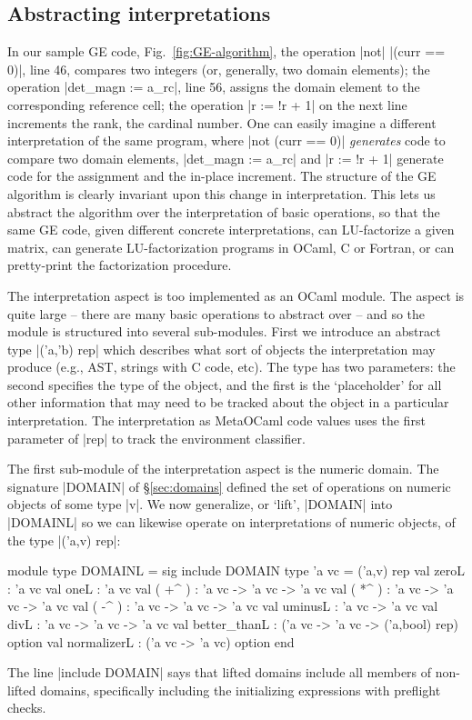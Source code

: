 \documentclass{elsart}
\begin{document}
\subsection{Abstracting interpretations}\label{sec:lifteddomains}

In our sample GE code, Fig.~\ref{fig:GE-algorithm}, the operation |not|
|(curr == 0)|, line 46, compares two integers (or, generally, two
domain elements); the operation |det_magn := a_rc|, line 56, assigns
the domain element to the corresponding reference cell; the operation
|r := !r + 1| on the next line increments the rank, the cardinal
number. One can easily imagine a different interpretation of the same
program, where |not (curr == 0)| \emph{generates} code to compare two
domain elements, |det_magn := a_rc| and |r := !r + 1| generate code
for the assignment and the in-place increment. The structure of the GE
algorithm is clearly invariant upon this change in
interpretation. This lets us abstract the algorithm over the
interpretation of basic operations, so that the same GE code, given
different concrete interpretations, can LU-factorize a given matrix,
can generate LU-factorization programs in OCaml, C or Fortran, or can
pretty-print the factorization procedure.

The interpretation aspect is too implemented as an OCaml module.  The
aspect is quite large -- there are many basic operations to abstract
over -- and so the module is structured into several
sub-modules. First we introduce an abstract type |('a,'b) rep| which
describes what sort of objects the interpretation may produce (e.g.,
AST, strings with C code, etc). The type has two parameters: the
second specifies the type of the object, and the first is the
`placeholder' for all other information that may need to be tracked
about the object in a particular interpretation. The interpretation as
MetaOCaml code values uses the first parameter of |rep| to track the
environment classifier.

The first sub-module of the interpretation aspect is the numeric
domain. The signature |DOMAIN| of \S\ref{sec:domains} defined the set
of operations on numeric objects of some type |v|. We now
generalize, or `lift', |DOMAIN| into |DOMAINL| so we can likewise
operate on interpretations of numeric objects, of the type
|('a,v) rep|:
\begin{code}
module type DOMAINL = sig
  include DOMAIN
  type 'a vc = ('a,v) rep
  val zeroL : 'a vc
  val oneL  : 'a vc
  val ( +^ ) : 'a vc -> 'a vc -> 'a vc
  val ( *^ ) : 'a vc -> 'a vc -> 'a vc
  val ( -^ ) : 'a vc -> 'a vc -> 'a vc
  val uminusL : 'a vc -> 'a vc
  val divL    : 'a vc -> 'a vc -> 'a vc
  val better_thanL : ('a vc -> 'a vc -> ('a,bool) rep) option
  val normalizerL  : ('a vc -> 'a vc) option
end 
\end{code}
The line |include DOMAIN| says that lifted domains include all members
of non-lifted domains, specifically including the initializing
expressions with preflight checks.
\end{document}
